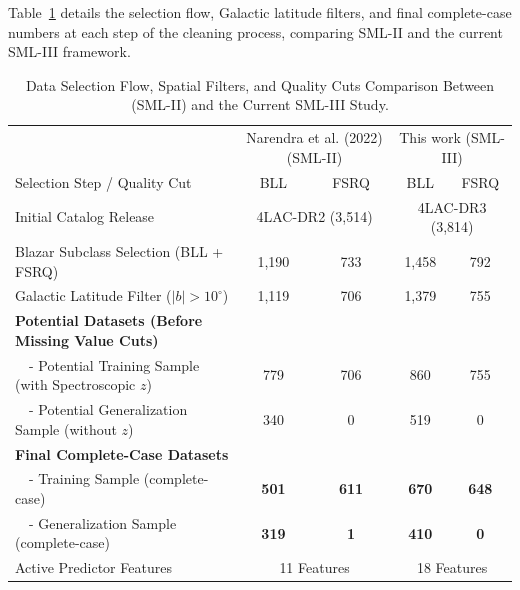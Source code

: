 \documentclass[twocolumn,linenumbers,floatfix]{aastex701}
\begin{document}
Table~\ref{tab:data_selection_flow} details the selection flow, Galactic latitude filters, and final complete-case numbers at each step of the cleaning process, comparing SML-II and the current SML-III framework.

\begin{table}[t!]
\centering
\caption{Data Selection Flow, Spatial Filters, and Quality Cuts Comparison Between \citep{Narendra2022} (SML-II) and the Current SML-III Study.}
\label{tab:data_selection_flow}
\begin{tabular}{lcccc}
\hline\hline
 & \multicolumn{2}{c}{Narendra et al. (2022) (SML-II)} & \multicolumn{2}{c}{This work (SML-III)} \\
Selection Step / Quality Cut & BLL & FSRQ & BLL & FSRQ \\
\hline
Initial Catalog Release & \multicolumn{2}{c}{4LAC-DR2 (3,514)} & \multicolumn{2}{c}{4LAC-DR3 (3,814)} \\
Blazar Subclass Selection (BLL + FSRQ) & 1,190 & 733 & 1,458 & 792 \\
Galactic Latitude Filter ($|b| > 10^\circ$) & 1,119 & 706 & 1,379 & 755 \\
\hline
\textbf{Potential Datasets (Before Missing Value Cuts)} & & & & \\
~~- Potential Training Sample (with Spectroscopic $z$) & 779 & 706 & 860 & 755 \\
~~- Potential Generalization Sample (without $z$) & 340 & 0 & 519 & 0 \\
\hline
\textbf{Final Complete-Case Datasets} & & & & \\
~~- Training Sample (complete-case) & \textbf{501} & \textbf{611} & \textbf{670} & \textbf{648} \\
~~- Generalization Sample (complete-case) & \textbf{319} & \textbf{1} & \textbf{410} & \textbf{0} \\
\hline
Active Predictor Features & \multicolumn{2}{c}{11 Features} & \multicolumn{2}{c}{18 Features} \\
\hline
\end{tabular}
\end{table}
\end{document}
